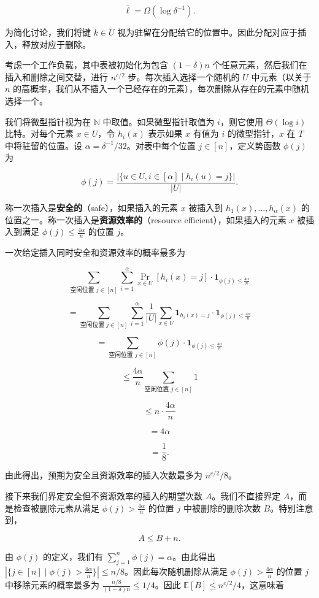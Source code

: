 \documentclass[12pt,a4paper]{ctexart}
\theoremstyle{remark}
\begin{document}
$$\bar{\ell}=\Omega(\log\delta^{-1}).$$

为简化讨论，我们将键 $k\in U$ 视为驻留在分配给它的位置中。因此分配对应于插入，释放对应于删除。

考虑一个工作负载，其中表被初始化为包含 $(1-\delta)n$ 个任意元素，然后我们在插入和删除之间交替，进行 $n^{c/2}$ 步。每次插入选择一个随机的 $U$ 中元素（以关于 $n$ 的高概率，我们从不插入一个已经存在的元素），每次删除从存在的元素中随机选择一个。

我们将微型指针视为在 $\mathbb{N}$ 中取值。如果微型指针取值为 $i$，则它使用 $\Theta(\log i)$ 比特。对每个元素 $x\in U$，令 $h_i(x)$ 表示如果 $x$ 有值为 $i$ 的微型指针，$x$ 在 $T$ 中将驻留的位置。设 $\alpha=\delta^{-1}/32$。对表中每个位置 $j\in[n]$，定义势函数 $\phi(j)$ 为

$$\phi(j)=\frac{|\{u\in U,i\in[\alpha]\mid h_i(u)=j\}|}{|U|}.$$

称一次插入是\textbf{安全的}（safe），如果插入的元素 $x$ 被插入到 $h_1(x),\ldots,h_\alpha(x)$ 的位置之一。称一次插入是\textbf{资源效率的}（resource efficient），如果插入的元素 $x$ 被插入到满足 $\phi(j)\leq\frac{4\alpha}{n}$ 的位置 $j$。

一次给定插入同时安全和资源效率的概率最多为

$$\sum_{\text{空闲位置 }j\in[n]}\sum_{i=1}^\alpha\Pr_{x\in U}[h_i(x)=j]\cdot\mathbf{1}_{\phi(j)\leq\frac{4\alpha}{n}}$$

$$=\sum_{\text{空闲位置 }j\in[n]}\sum_{i=1}^\alpha\frac{1}{|U|}\sum_{x\in U}\mathbf{1}_{h_i(x)=j}\cdot\mathbf{1}_{\phi(j)\leq\frac{4\alpha}{n}}$$

$$=\sum_{\text{空闲位置 }j\in[n]}\phi(j)\cdot\mathbf{1}_{\phi(j)\leq\frac{4\alpha}{n}}$$

$$\leq\frac{4\alpha}{n}\sum_{\text{空闲位置 }j\in[n]}1$$

$$\leq n\cdot\frac{4\alpha}{n}$$

$$=4\alpha$$

$$=\frac{1}{8}.$$

由此得出，预期为安全且资源效率的插入次数最多为 $n^{c/2}/8$。

接下来我们界定安全但不资源效率的插入的期望次数 $A$。我们不直接界定 $A$，而是检查被删除元素从满足 $\phi(j)>\frac{4\alpha}{n}$ 的位置 $j$ 中被删除的删除次数 $B$。特别注意到，

$$A\leq B+n.$$

由 $\phi(j)$ 的定义，我们有 $\sum_{j=1}^n\phi(j)=\alpha$。由此得出 $|\{j\in[n]\mid\phi(j)>\frac{4\alpha}{n}\}|\leq n/8$。因此每次随机删除从满足 $\phi(j)>\frac{4\alpha}{n}$ 的位置 $j$ 中移除元素的概率最多为 $\frac{n/8}{(1-\delta)n}\leq 1/4$。因此 $\mathbb{E}[B]\leq n^{c/2}/4$，这意味着
\end{document}
